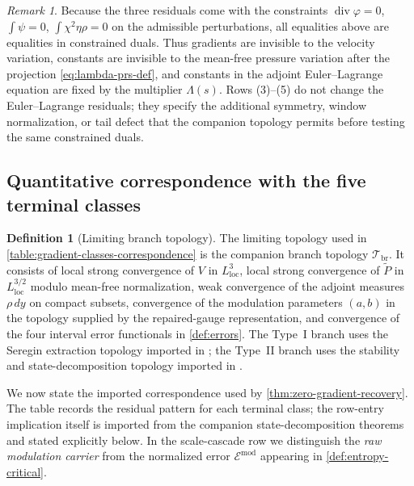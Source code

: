 \documentclass[11pt]{amsart}
\numberwithin{equation}{section}
\theoremstyle{plain}
\theoremstyle{definition}
\newtheorem{definition}[theorem]{Definition}
\theoremstyle{remark}
\newtheorem{remark}[theorem]{Remark}
\newcommand{\Err}{\mathcal E}
\newcommand{\diver}{\operatorname{div}}
\begin{document}
\begin{remark}\label{rem:component-vanishing}
Because the three residuals come with the constraints
\(\diver\varphi=0\), \(\int\psi=0\), \(\int\chi^2\eta\rho=0\) on the
admissible perturbations, all equalities above are equalities in constrained
duals.  Thus gradients are invisible to the velocity variation, constants
are invisible to the mean-free pressure variation after the projection
\eqref{eq:lambda-prs-def}, and constants in the adjoint Euler--Lagrange
equation are fixed by the multiplier \(\Lambda(s)\).  Rows (3)--(5) do not
change the Euler--Lagrange residuals; they specify the additional symmetry,
window normalization, or tail defect that the companion topology permits
before testing the same constrained duals.
\end{remark}

\subsection{Quantitative correspondence with the five terminal classes}

\begin{definition}[Limiting branch topology]
\label{def:branch-topology}
The limiting topology used in \cref{table:gradient-classes-correspondence}
is the companion branch topology \(\mathcal T_{\mathrm{br}}\).  It consists
of local strong convergence of \(V\) in \(L^3_{\mathrm{loc}}\), local strong
convergence of \(\widetilde P\) in \(L^{3/2}_{\mathrm{loc}}\) modulo
mean-free normalization, weak convergence of the adjoint measures
\(\rho\,dy\) on compact subsets, convergence of the modulation parameters
\((a,b)\) in the topology supplied by the repaired-gauge representation,
and convergence of the four interval error functionals in
\cref{def:errors}.  The Type~I branch uses the Seregin extraction topology
imported in ; the Type~II branch uses the
stability and state-decomposition topology imported in
.
\end{definition}

We now state the imported correspondence used by
\cref{thm:zero-gradient-recovery}.  The table records the residual pattern
for each terminal class; the row-entry implication itself is imported from
the companion state-decomposition theorems and stated explicitly below.  In
the scale-cascade row we distinguish the \emph{raw modulation carrier} from
the normalized error \(\Err^{\mathrm{mod}}\) appearing in
\cref{def:entropy-critical}.
\end{document}
